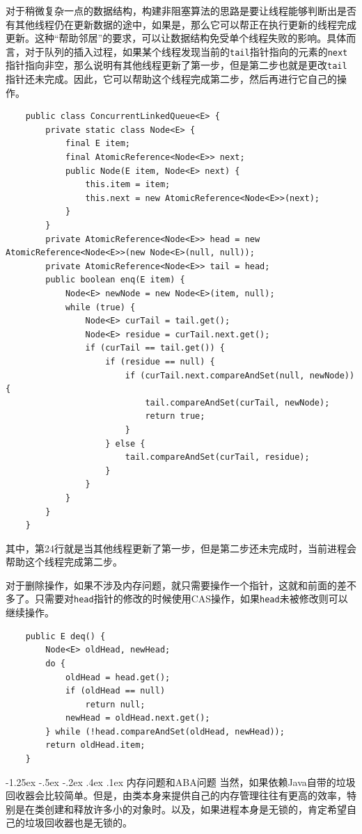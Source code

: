 \documentclass[a4paper, 11pt]{ctexart}
\makeatletter
\newcommand{\xiaosihao}{\fontsize{12pt}{\baselineskip}\selectfont}
\renewcommand\subsection{\@startsection{subsection}{1}{\z@}%
{-1.25ex \@plus -.5ex \@minus -.2ex}%
{.4ex \@plus .1ex}%
{\normalfont\xiaosihao\CJKfamily{hei}}}
\makeatother
\begin{document}
对于稍微复杂一点的数据结构，构建非阻塞算法的思路是要让线程能够判断出是否有其他线程仍在更新数据的途中，如果是，那么它可以帮正在执行更新的线程完成更新。这种“帮助邻居”的要求，可以让数据结构免受单个线程失败的影响。具体而言，对于队列的插入过程，如果某个线程发现当前的\lstinline|tail|指针指向的元素的\lstinline|next|指针指向非空，那么说明有其他线程更新了第一步，但是第二步也就是更改\lstinline|tail|指针还未完成。因此，它可以帮助这个线程完成第二步，然后再进行它自己的操作。
\begin{lstlisting}
    public class ConcurrentLinkedQueue<E> {
        private static class Node<E> {
            final E item;
            final AtomicReference<Node<E>> next;
            public Node(E item, Node<E> next) {
                this.item = item;
                this.next = new AtomicReference<Node<E>>(next);
            }
        }
        private AtomicReference<Node<E>> head = new AtomicReference<Node<E>>(new Node<E>(null, null));
        private AtomicReference<Node<E>> tail = head;
        public boolean enq(E item) {
            Node<E> newNode = new Node<E>(item, null);
            while (true) {
                Node<E> curTail = tail.get();
                Node<E> residue = curTail.next.get();
                if (curTail == tail.get()) {
                    if (residue == null) {
                        if (curTail.next.compareAndSet(null, newNode)) {
                            tail.compareAndSet(curTail, newNode);
                            return true;
                        }
                    } else {
                        tail.compareAndSet(curTail, residue);
                    }
                }
            }
        }
    }
\end{lstlisting}

其中，第24行就是当其他线程更新了第一步，但是第二步还未完成时，当前进程会帮助这个线程完成第二步。

对于删除操作，如果不涉及内存问题，就只需要操作一个指针，这就和前面的差不多了。只需要对\lstinline|head|指针的修改的时候使用CAS操作，如果\lstinline|head|未被修改则可以继续操作。
\begin{lstlisting}
    public E deq() {
        Node<E> oldHead, newHead;
        do {
            oldHead = head.get();
            if (oldHead == null)
                return null;
            newHead = oldHead.next.get();
        } while (!head.compareAndSet(oldHead, newHead));
        return oldHead.item;
    }
\end{lstlisting}
\subsection{内存问题和ABA问题}
当然，如果依赖Java自带的垃圾回收器会比较简单。但是，由类本身来提供自己的内存管理往往有更高的效率，特别是在类创建和释放许多小的对象时。以及，如果进程本身是无锁的，肯定希望自己的垃圾回收器也是无锁的。
\end{document}
